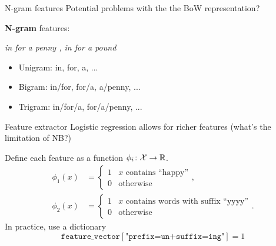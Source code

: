 \documentclass[usenames,dvipsnames,notes,11pt,aspectratio=169]{beamer}
\newcommand{\pdfnote}[1]{}
\begin{document}
\begin{frame}
    {N-gram features}
    Potential problems with the the BoW representation?

    \pause
    \textbf{N-gram} features:
    \begin{center}
        \textit{in for a penny , in for a pound}
    \end{center}
    \begin{itemize}
        \item Unigram: in, for, a, ...
        \item Bigram: in/for, for/a, a/penny, ...
        \item Trigram: in/for/a, for/a/penny, ...
    \end{itemize}

    \pdfnote{
        BoW problem: new york, don't like
    }
\end{frame}

\begin{frame}
    {Feature extractor}
    Logistic regression allows for richer features (what's the limitation of NB?)

    Define each feature as a function $\phi_i\colon \mathcal{X} \rightarrow \mathbb{R}$.
    \begin{align*}
 \phi_1(x) &= \begin{cases}
 1 & \text{$x$ contains ``happy''} \\
 0 & \text{otherwise}
 \end{cases} ,
 \\
 \phi_2(x) &= \begin{cases}
 1 & \text{$x$ contains words with suffix ``yyyy''} \\
 0 & \text{otherwise}
 \end{cases} .
    \end{align*}
    In practice, use a dictionary
    $$
    \texttt{feature\_vector}[\texttt{"prefix=un+suffix=ing"}] = 1
    $$
    \pdfnote{
        With NB, we can still include these features as variables, but we'll have to think about modeling them as a parametrized distribution and handling the sparsity problem during estimation.
    }
\end{frame}
\end{document}
